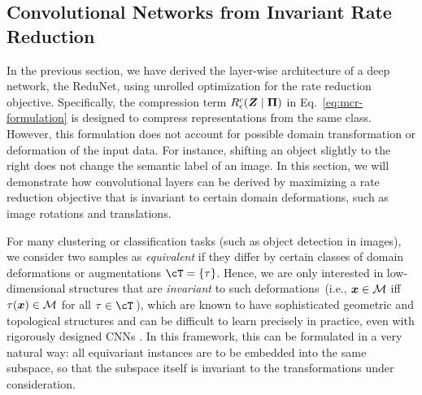 \documentclass[../../book-main.tex]{subfiles}
\begin{document}
\subsection{Convolutional Networks from Invariant Rate Reduction}\label{sec:shift-invariant}

In the previous section, we have derived the layer-wise architecture of a deep network, the ReduNet, using unrolled optimization for the rate reduction objective. 
Specifically, the compression term $R^c_\epsilon(\bm{Z} \mid\bm \Pi)$ in Eq.~\eqref{eq:mcr-formulation} is designed to compress representations from the same class. However, this formulation does not account for possible domain transformation or deformation of the input data. For instance, shifting an object slightly to the right does not change the semantic label of an image.  In this section, we will demonstrate how convolutional layers can be derived by maximizing a rate reduction objective that is invariant to certain domain deformations, such as image rotations and translations. 


For many clustering or classification tasks (such as object detection in images), we consider two samples as {\em equivalent} if they differ by certain classes of domain deformations or augmentations $\cT = \{\tau \}$. Hence, we are only interested in low-dimensional structures that are {\em invariant} to such deformations~(i.e., $\bm{x} \in \mathcal{M}$ iff $\tau(\bm{x}) \in \mathcal{M}$ for all $\tau \in \cT$\,), 
which are known to have sophisticated geometric and topological structures and can be difficult to learn precisely in practice, even with rigorously designed CNNs \cite{Cohen-ICML-2016}. 
In this framework, this can be formulated in a very natural way: all equivariant instances are to be embedded into the same subspace, so that the subspace itself is invariant to the transformations under consideration.
\end{document}
